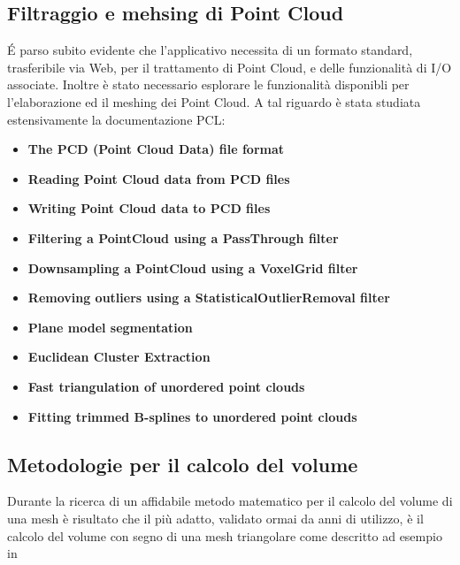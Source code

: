\subsection{Filtraggio e mehsing di Point Cloud}
\'E parso subito evidente che l'applicativo necessita di un formato standard, trasferibile via Web, per il trattamento di Point Cloud, e delle funzionalità di I/O associate. Inoltre è stato necessario esplorare le funzionalità disponibli per l'elaborazione ed il meshing dei Point Cloud. A tal riguardo è stata studiata estensivamente la documentazione PCL:
\begin{itemize}
\item\textbf{The PCD (Point Cloud Data) file format} \cite{site:PCD}
\item\textbf{Reading Point Cloud data from PCD files} \cite{site:PCD-read}
\item\textbf{Writing Point Cloud data to PCD files} \cite{site:PCD-write}
\item\textbf{Filtering a PointCloud using a PassThrough filter} \cite{site:passthrough}
\item\textbf{Downsampling a PointCloud using a VoxelGrid filter} \cite{site:voxel}
\item\textbf{Removing outliers using a StatisticalOutlierRemoval filter} \cite{site:outliers}
\item\textbf{Plane model segmentation}\cite{site:segmentation}
\item\textbf{Euclidean Cluster Extraction}\cite{site:cluster}
\item \textbf{Fast triangulation of unordered point clouds}\cite{site:meshing}
\item \textbf{Fitting trimmed B-splines to unordered point clouds}\cite{site:bsplines}
\end{itemize}

\subsection{Metodologie per il calcolo del volume}
Durante la ricerca di un affidabile metodo matematico per il calcolo del volume di una mesh è risultato che il più adatto, validato ormai da anni di utilizzo, è il calcolo del volume con segno di una mesh triangolare come descritto ad esempio in \cite{}

